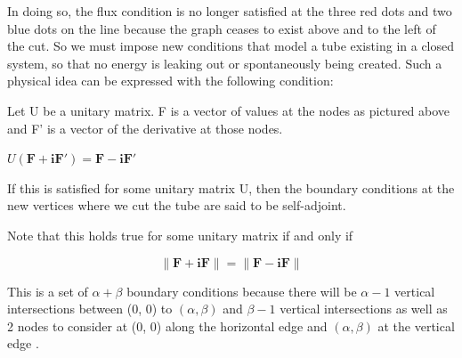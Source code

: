 \documentclass[12pt]{article}
\begin{document}
\centerline{}

In doing so, the flux condition is no longer satisfied at the three red dots and two blue dots on the line because the graph ceases to exist above and to the left of the cut. So we must impose new conditions that model a tube existing in a closed system, so that no energy is leaking out or spontaneously being created. Such a physical idea can be expressed with the following condition: 

Let U be a unitary matrix. F is a vector of values at the nodes as pictured above and F' is a vector of the derivative at those nodes. 

$U\mathbf{(F + iF')} = \mathbf{F-iF'}$ 

If this is satisfied for some unitary matrix U, then the boundary conditions at the new vertices where we cut the tube are said to be self-adjoint. 




Note that this holds true for some unitary matrix if and only if 

\[
\lVert \mathbf{F+iF} \rVert =\lVert \mathbf{F-iF} \rVert 
\]


This is a set of $\alpha + \beta$ boundary conditions because there will be $\alpha -1$ vertical intersections between (0, 0) to $(\alpha, \beta)$ and $\beta-1$ vertical intersections as well as 2 nodes to consider at (0, 0) along the horizontal edge and $(\alpha, \beta)$ at the vertical edge .
\end{document}

